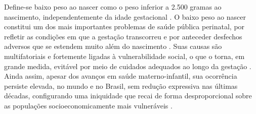 

Define-se baixo peso ao nascer como o peso inferior a 2.500 gramas ao nascimento, independentemente da idade gestacional \cite{blencowe2019}.
O baixo peso ao nascer constitui um dos mais importantes problemas de saúde pública perinatal, por refletir as condições em que a gestação transcorreu e por anteceder desfechos adversos que se estendem muito além do nascimento \cite{falcao2020,kramer1987}. Suas causas são multifatoriais e fortemente ligadas à vulnerabilidade social, o que o torna, em grande medida, evitável por meio de cuidados adequados ao longo da gestação \cite{kramer1987,fonseca2014}. Ainda assim, apesar dos avanços em saúde materno-infantil, sua ocorrência persiste elevada, no mundo e no Brasil, sem redução expressiva nas últimas décadas, configurando uma iniquidade que recai de forma desproporcional sobre as populações socioeconomicamente mais vulneráveis \cite{falcao2020,blencowe2019}.



